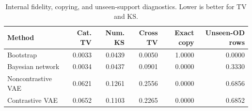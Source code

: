 \begin{table}[!htbp]
\caption{Internal fidelity, copying, and unseen-support diagnostics. Lower is better for TV and KS.}
\label{tab:internal}
\centering
\setlength{\tabcolsep}{3.2pt}
\begin{tabularx}{\textwidth}{Y r r r r r}
\toprule
\textbf{Method} & \textbf{Cat. TV} & \textbf{Num. KS} & \textbf{Cross TV} & \textbf{Exact copy} & \textbf{Unseen-OD rows} \\
\midrule
Bootstrap & 0.0033 & 0.0439 & 0.0050 & 1.0000 & 0.0000 \\
Bayesian network & 0.0034 & 0.0437 & 0.0901 & 0.0000 & 0.3330 \\
Noncontrastive VAE & 0.0621 & 0.1261 & 0.2556 & 0.0000 & 0.6856 \\
Contrastive VAE & 0.0652 & 0.1103 & 0.2265 & 0.0000 & 0.6852 \\
\bottomrule
\end{tabularx}
\end{table}
